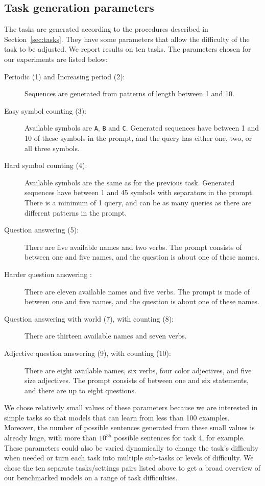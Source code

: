 \subsection{Task generation parameters\label{sec:task-gen-params}}
The tasks are generated according to the procedures described in
Section~\ref{sec:tasks}. They have some parameters that allow the
difficulty of the task to be adjusted. We report results on ten tasks. The parameters
chosen for our experiments are listed below:
\vspace{-8pt}
\begin{description}
  \item[Periodic (1) and Increasing period (2):] Sequences are generated from patterns of
        length between 1 and 10.
  \item[Easy symbol counting (3):] Available symbols are \texttt{A}, \texttt{B} and
        \texttt{C}. Generated sequences have between 1 and 10 of these symbols
        in the prompt, and the query has either one, two, or all three symbols.
  \item[Hard symbol counting (4):] Available symbols are the same as for the previous
        task. Generated sequences have between 1 and 45 symbols
        with separators in the prompt. There is a minimum of 1 query, and can be
        as many queries as there are different patterns in the prompt.
  \item[Question answering (5):] There are five available names and two verbs. The
        prompt consists of between one and five names, and the question is about one
        of these names.
  \item[Harder question answering :] There are eleven available names and five
        verbs. The prompt is made of between one and five names, and the
        question is about one of these names.
  \item[Question answering with world (7), with counting (8):] There are thirteen available
        names and seven verbs.
  \item[Adjective question answering (9), with counting (10):] There are eight
        available names, six verbs, four color adjectives, and five size
        adjectives. The prompt consists of between one and six statements, and
        there are up to eight questions.
\end{description}

\vspace{-8pt}
We chose relatively small values of these parameters because we are interested in simple tasks
so that models that can learn from less than 100 examples. Moreover, the
number of possible sentences generated from these small values is already huge,
with more than $10^{35}$ possible sentences for task 4, for example. These
parameters could also be varied dynamically to change the task's difficulty when
needed or turn each task into multiple sub-tasks or levels of difficulty. We
chose the ten separate tasks/settings pairs listed above to get a broad overview of our
benchmarked models on a range of task difficulties.

